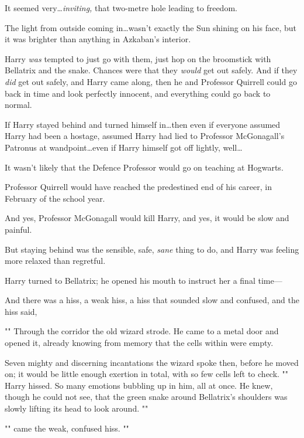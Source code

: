 It seemed very…\emph{inviting,} that two-metre hole leading to freedom.

The light from outside coming in…wasn’t exactly the Sun shining on his
face, but it was brighter than anything in Azkaban’s interior.

Harry \emph{was} tempted to just go with them, just hop on the broomstick with
Bellatrix and the snake. Chances were that they \emph{would} get out safely.
And if they \emph{did} get out safely, and Harry came along, then he and
Professor Quirrell could go back in time and look perfectly innocent, and
everything could go back to normal.

If Harry stayed behind and turned himself in…then even if everyone
assumed Harry had been a hostage, assumed Harry had lied to Professor
McGonagall’s Patronus at wandpoint…even if Harry himself got off
lightly, well…

It wasn’t likely that the Defence Professor would go on teaching at Hogwarts.

Professor Quirrell would have reached the predestined end of his career, in
February of the school year.

And yes, Professor McGonagall would kill Harry, and yes, it would be slow and
painful.

But staying behind was the sensible, safe, \emph{sane} thing to do, and Harry
was feeling more relaxed than regretful.

Harry turned to Bellatrix; he opened his mouth to instruct her a final time—

And there was a hiss, a weak hiss, a hiss that sounded slow and confused, and
the hiss said,

""
\later
Through the corridor the old wizard strode. He came to a metal door and opened
it, already knowing from memory that the cells within were empty.

Seven mighty and discerning incantations the wizard spoke then, before he moved
on; it would be little enough exertion in total, with so few cells left to
check.
\later
"" Harry hissed. So many emotions bubbling up in him, all at
once. He knew, though he could not see, that the green snake around Bellatrix’s
shoulders was slowly lifting its head to look around. ""

"" came the weak, confused hiss. ""


